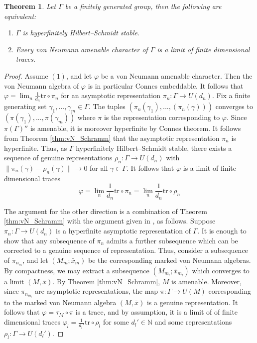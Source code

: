 \documentclass[11pt]{amsart}
\newcommand{\N}{{\mathbb{N}}}
\newtheorem{theorem}{Theorem}[section]
\theoremstyle{definition}
\theoremstyle{remark}
\theoremstyle{definition}
\begin{document}
\begin{theorem}\label{thm:HS_for_non_amenable_grps}
Let $\Gamma$ be a finitely generated group, then the following are equivalent:
\begin{enumerate}
    \item $\Gamma$ is hyperfinitely Hilbert--Schmidt stable.
    \item Every von Neumann amenable character of  $\Gamma$ is a limit of finite dimensional traces. 
\end{enumerate}
\end{theorem}
\begin{proof}
Assume $(1)$, and let $\varphi$ be a von Neumann amenable character. Then the von Neumann algebra of $\varphi$ is in particular Connes embeddable. It follows that $\varphi=\lim_n \frac{1}{d_n}\mathrm{tr}\circ \pi_n$ for an asymptotic representation $\pi_n:\Gamma\to U(d_n)$. Fix a finite generating set $\gamma_1 ,...,\gamma_m\in \Gamma$. The tuples $(\pi_n (\gamma_1 ),...,(\pi_n(\gamma)))$ converges to $(\pi(\gamma_1),...,\pi(\gamma_m))$ where $\pi$ is the representation corresponding to $\varphi$. Since $\pi(\Gamma)''$ is amenable, it is moreover hyperfinite by Connes theorem. 
It follows from Theorem \ref{thm:vN_Schramm} that the asymptotic representation $\pi_n$ is hyperfinite. Thus, as $\Gamma$ hyperfinitely Hilbert--Schmidt stable, there exists a sequence of genuine representations $\rho_n:\Gamma\to U(d_n)$ with $\|\pi_n(\gamma)-\rho_n(\gamma)\|\to 0$ for all $\gamma\in \Gamma$. It follows that $\varphi$ is a limit of finite dimensional traces
$$\varphi=\lim_n \frac{1}{d_n}\mathrm{tr}\circ \pi_n=\lim_n \frac{1}{d_n}\mathrm{tr}\circ \rho_n $$

The argument for the other direction is a combination of Theorem \ref{thm:vN_Schramm}  with the argument given in \cite[Theorem 4]{HS_grp}, as follows. 
    Suppose $\pi_n: \Gamma \to U(d_n)$ is a hyperfinite asymptotic representation of $\Gamma$. It is enough to show that any subsequence of $\pi_n$ admits a further subsequence which can be corrected to a genuine sequence of representation. Thus, consider a subsequence of $\pi_{n_m}$, and let $(M_m;\bar{x}_m)$ be the corresponding marked von Neumann algebras. By  compactness, we may extract a subsequence  $(M_{m_l};\bar{x}_{m_l})$ which converges to a limit $(M,\bar{x})$. By Theorem \ref{thm:vN_Schramm}, $M$ is amenable. Moreover, since $\pi_{n_{m_l}}$ are asymptotic representations, the map $\pi:\Gamma\to U(M)$ corresponding to the marked von Neumann algebra $(M,\bar{x})$ is a genuine representation. 
    It follows that $\varphi=\tau_M \circ \pi$ is a trace, and by assumption, it is a limit of of finite dimensional traces $\varphi_l=\frac{1}{d_l'}\mathrm{tr}\circ \rho_l$ for some $d_l' \in \N $ and some representations $\rho_l:\Gamma\to U(d_l' )$. 
    

\end{proof}
\end{document}
